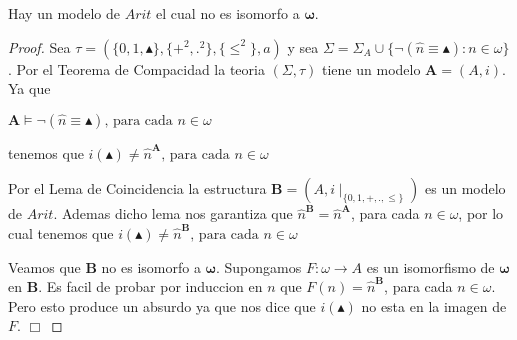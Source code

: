   \begin{proposition} \label{proposition_92}
    \PN Hay un modelo de $Arit$ el cual no es isomorfo a $\pmb{\omega}$.
  \end{proposition}
  \begin{proof}
    Sea $\tau =(\{0,1,\blacktriangle \},\{+^{2},.^{2}\},\{\leq ^{2}\},a)$ y sea $ \Sigma =\Sigma _{A}\cup \{\lnot (\widehat{n}\equiv \blacktriangle ):n\in \omega \}$. Por el Teorema de Compacidad la teoria $(\Sigma ,\tau )$ tiene un modelo $\mathbf{A}=(A,i)$. Ya que

    $\displaystyle \mathbf{A}\vDash \lnot (\widehat{n}\equiv \blacktriangle )\text{, para cada } n\in \omega $

    tenemos que
    $\displaystyle i(\blacktriangle )\neq \widehat{n}^{\mathbf{A}}\text{, para cada }n\in \omega $

    Por el Lema de Coincidencia la estructura $\mathbf{B}=(A,i\mid _{\{0,1,+,.,\leq \}})$ es un modelo de $Arit$. Ademas dicho lema nos garantiza que $\widehat{n}^{\mathbf{B}}=\widehat{n}^{\mathbf{A}}$, para cada $n\in \omega $, por lo cual tenemos que
    $\displaystyle i(\blacktriangle )\neq \widehat{n}^{\mathbf{B}}\text{, para cada }n\in \omega $

    Veamos que $\mathbf{B}$ no es isomorfo a $\mathbf{\omega }$. Supongamos $ F:\omega \rightarrow A$ es un isomorfismo de $\mathbf{\omega }$ en $\mathbf{B }$. Es facil de probar por induccion en $n$ que $F(n)=\widehat{n}^{\mathbf{B} }$, para cada $n\in \omega $. Pero esto produce un absurdo ya que nos dice que $i(\blacktriangle )$ no esta en la imagen de $F$. $\Box$
  \end{proof}

